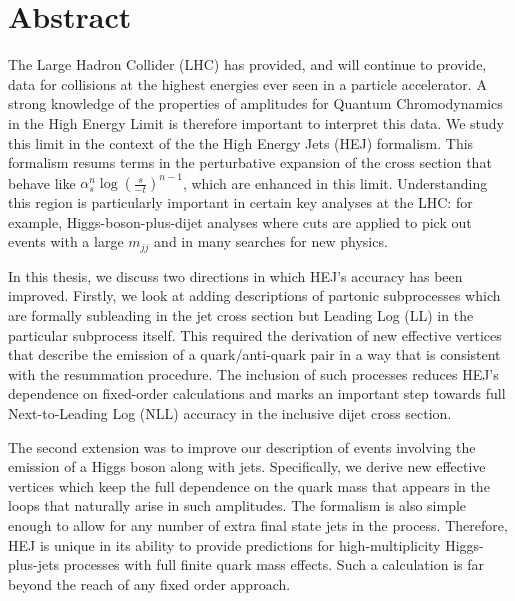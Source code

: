 \chapter{Abstract}

The Large Hadron Collider (LHC) has provided, and will continue to provide, data for collisions at the highest energies ever seen in a particle accelerator. A strong knowledge of the properties of amplitudes for Quantum Chromodynamics in the High Energy Limit is therefore important to interpret this data. We study this limit in the context of the the High Energy Jets (HEJ) formalism. This formalism resums terms in the perturbative expansion of the cross section that behave like $\alpha_s^n \log(\frac{s}{-t})^{n-1}$, which are enhanced in this limit. Understanding this region is particularly important in certain key analyses at the LHC: for example, Higgs-boson-plus-dijet analyses where cuts are applied to pick out events with a large $m_{jj}$ and in many searches for new physics.

In this thesis, we discuss two directions in which HEJ's accuracy has been improved. Firstly, we look at adding descriptions of partonic subprocesses which are formally subleading in the jet cross section but Leading Log (LL) in the particular subprocess itself. This required the derivation of new effective vertices that describe the emission of a quark/anti-quark pair in a way that is consistent with the resummation procedure. The inclusion of such processes reduces HEJ's dependence on fixed-order calculations and marks an important step towards full Next-to-Leading Log (NLL) accuracy in the inclusive dijet cross section. 

The second extension was to improve our description of events involving the emission of a Higgs boson along with jets. Specifically, we derive new effective vertices which keep the full dependence on the quark mass that appears in the loops that naturally arise in such amplitudes. The formalism is also simple enough to allow for any number of extra final state jets in the process. Therefore, HEJ is unique in its ability to provide predictions for high-multiplicity Higgs-plus-jets processes with full finite quark mass effects. Such a calculation is far beyond the reach of any fixed order approach. 

